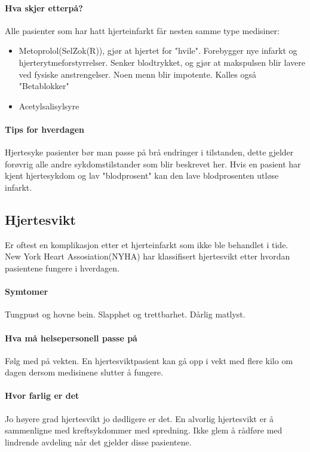 				\paragraph{Hva skjer etterpå?\\}
					Alle pasienter som har hatt hjerteinfarkt får nesten samme type medisiner:
					\begin{itemize}
						\item Metoprolol(SelZok(R)), gjør at hjertet for "hvile". Forebygger nye infarkt og hjerterytmeforstyrrelser. Senker blodtrykket, og gjør at makspulsen blir lavere ved fysiske anstrengelser. Noen menn blir impotente. Kalles også "Betablokker"\\
						\item Acetylsalisylsyre\\%
					\end{itemize}
				\paragraph{Tips for hverdagen\\}
					Hjertesyke pasienter bør man passe på brå endringer i tilstanden, dette gjelder forøvrig alle andre sykdomstilstander som blir beskrevet her. Hvis en pasient har kjent hjertesykdom og lav "blodprosent" kan den lave blodprosenten utløse infarkt.
			\subsection{Hjertesvikt}
				Er oftest en komplikasjon etter et hjerteinfarkt som ikke ble behandlet i tide. New York Heart Assosiation(NYHA) har klassifisert hjertesvikt etter hvordan pasientene fungere i hverdagen. 
				\paragraph{Symtomer\\}
					Tungpust og hovne bein. Slapphet og trettbarhet. Dårlig matlyst.
				\paragraph{Hva må helsepersonell passe på\\}
					Følg med på vekten. En hjertesviktpasient kan gå opp i vekt med flere kilo om dagen dersom medisinene slutter å fungere. 
				\paragraph{Hvor farlig er det\\}
					Jo høyere grad hjertesvikt jo dødligere er det. En alvorlig hjertesvikt er å sammenligne med kreftsykdommer med spredning. Ikke glem å rådføre med lindrende avdeling når det gjelder disse pasientene.
